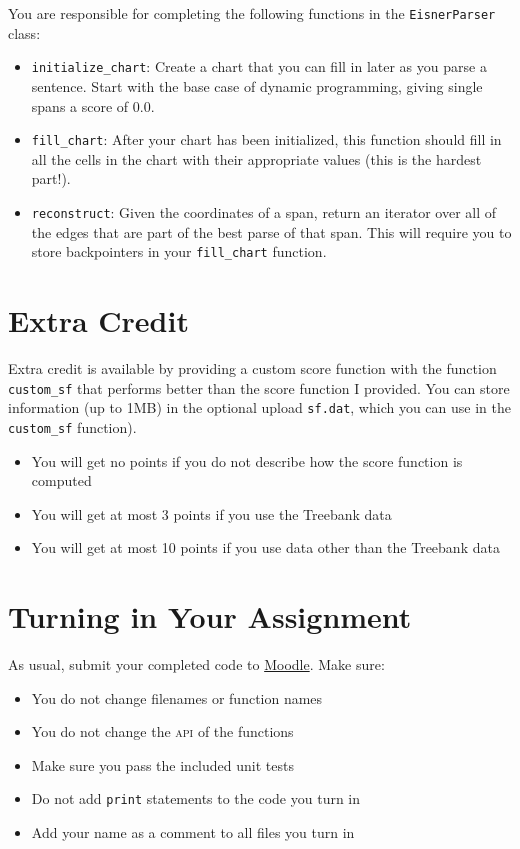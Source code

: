 \documentclass[11pt]{article}
\begin{document}
You are responsible for completing the following functions in the
\texttt{EisnerParser} class:
\begin{itemize}
\item \texttt{initialize\_chart}: Create a chart that you can fill in later as you parse a sentence.  Start with the base case of dynamic programming, giving single spans a score of 0.0.
\item \texttt{fill\_chart}: After your chart has been initialized, this function should fill in all the cells in the chart with their appropriate values (this is the hardest part!).
\item \texttt{reconstruct}: Given the coordinates of a span, return an
iterator over all of the edges that are part of the best parse of that
span.  This will require you to store backpointers in your \texttt{fill\_chart}
function.
\end{itemize}

\section*{Extra Credit}

Extra credit is available by providing a custom score function with
the function \texttt{custom\_sf} that performs better than the score function I
provided.  You can store information (up to 1MB) in the optional
upload \texttt{sf.dat}, which you can use in the \texttt{custom\_sf}
function).
\begin{itemize}
\item You will get no points if you do not describe how the score function is computed
\item You will get at most 3 points if you use the Treebank data
\item You will get at most 10 points if you use data other than the
  Treebank data
\end{itemize}

\section*{Turning in Your Assignment}

As usual, submit your completed code to
\href{https://moodle.cs.colorado.edu/course/view.php?id=161}{Moodle}.
Make sure:
\begin{itemize}
  \item You do not change filenames or function names
  \item You do not change the \textsc{api} of the functions
  \item Make sure you pass the included unit tests
  \item Do not add \texttt{print} statements to the code you turn in
  \item Add your name as a comment to all files you turn in
\end{itemize}
\end{document}
